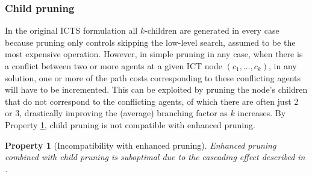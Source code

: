 \documentclass[english]{article}
\newtheorem{property}{Property}
\begin{document}
	\subsubsection{Child pruning}
	In the original ICTS formulation all $k$-children are generated in every case because pruning only controls skipping the low-level search, assumed to be the most expensive operation. However, in simple pruning in any case, when there is a conflict between two or more agents at a given ICT node $(c_1,\ldots,c_k)$, in any solution, one or more of the path costs corresponding to these conflicting agents will have to be incremented. This can be exploited by pruning the node's children that do not correspond to the conflicting agents, of which there are often just 2 or 3, drastically improving the (average) branching factor as $k$ increases. By Property \ref{property:ec-incompat}, child pruning is not compatible with enhanced pruning.
	\begin{property}[Incompatibility with enhanced pruning]
		Enhanced pruning combined with child pruning is suboptimal due to the \textit{cascading effect} described in \cite{sharon2011}.
		\label{property:ec-incompat}
	\end{property}
	
\end{document}
